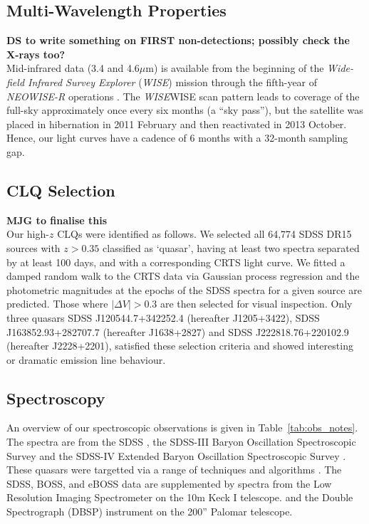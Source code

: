 \documentclass[fleqn,usenatbib]{mnras}
\begin{document}
\subsection{Multi-Wavelength Properties}
{\bf DS to write something on FIRST non-detections; possibly check the X-rays too?} \\
Mid-infrared data (3.4 and 4.6$\mu$m) is available from the beginning
of the {\it Wide-field Infrared Survey Explorer} ({\it WISE}) mission
\citep[2010 January; ][]{Wright2010} through the fifth-year of {\it
NEOWISE-R} operations \citep[2018 December; ][]{Mainzer2011}. The {\it
WISE}WISE scan pattern leads to coverage of the full-sky approximately
once every six months (a ``sky pass''), but the satellite was placed
in hibernation in 2011 February and then reactivated in 2013
October. Hence, our light curves have a cadence of 6 months with a
32-month sampling gap. 


\subsection{CLQ Selection}
{\bf MJG to finalise this} \\
Our high-$z$ CLQs were identified as follows.  We selected all 64,774
SDSS DR15 sources with $z > 0.35$ classified as `quasar', having at least
two spectra separated by at least 100 days, and with a corresponding
CRTS light curve. We fitted a damped random walk to the CRTS data via
Gaussian process regression and the photometric magnitudes at the
epochs of the SDSS spectra for a given source are predicted. Those
where $|\Delta V| > 0.3$ are then selected for visual
inspection. Only three quasars SDSS J120544.7+342252.4 (hereafter
J1205+3422), SDSS J163852.93+282707.7 (hereafter J1638+2827) and SDSS
J222818.76+220102.9 (hereafter J2228+2201), satisfied these selection
criteria and showed interesting or dramatic emission line behaviour.





\subsection{Spectroscopy}
An overview of our spectroscopic observations is given in
Table~\ref{tab:obs_notes}.  The spectra are from the SDSS
\citep{Stoughton2002, DR7, Schneider2010}, the SDSS-III Baryon
Oscillation Spectroscopic Survey \citep[BOSS; ][]{Eisenstein2011,
Dawson2013, Smee2013, Alam2015, Paris2017} and the SDSS-IV Extended
Baryon Oscillation Spectroscopic Survey \citep[eBOSS; ][]{Dawson2016,
Abolfathi2018, Paris2018}.  These quasars were targetted via a range
of techniques and algorithms \citep[see ][]{Richards2002, Ross2012,
Myers2015}. The SDSS, BOSS, and eBOSS data are supplemented by
spectra from the Low Resolution Imaging Spectrometer \citep[LRIS; ][]{Oke1995} on the 10m
Keck {\sc I} telescope.  and the Double Spectrograph
(DBSP) instrument on the 200'' Palomar telescope.
\end{document}
